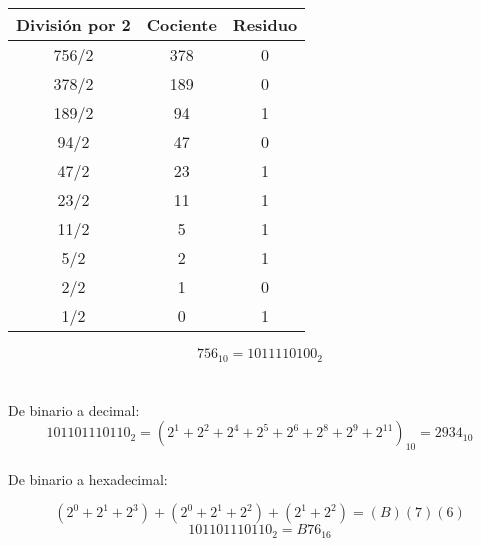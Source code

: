 \documentclass{article}
\begin{document}
\section{}
\begin{center}
    \begin{tabular}{ |c|c|c| }
        \hline
        División por 2 & Cociente & Residuo \\
        \hline
        756/2 & 378 & 0 \\
        378/2 & 189 & 0 \\
        189/2 & 94 & 1 \\
        94/2 & 47 & 0 \\
        47/2 & 23 & 1 \\
        23/2 & 11 & 1 \\
        11/2 & 5 & 1 \\
        5/2 & 2 & 1 \\
        2/2 & 1 & 0 \\
        1/2 & 0 & 1 \\
        \hline
    \end{tabular}
\end{center}
\[
    756_{10} = 1011110100_2
\]
\section{}


De binario a decimal:\\
\[
101101110110_2 = (2^1 + 2^2 + 2^4 + 2^5 + 2^6 + 2^8 + 2^9 + 2^{11})_{10} = 2934_{10}
\]
\\De binario a hexadecimal:

\[
(2^0 + 2^1 + 2^3)+(2^0 + 2^1 + 2^2)+(2^1+2^2) = (B)(7)(6)
\]
\[
101101110110_2 = B76_{16}
\]
\end{document}
